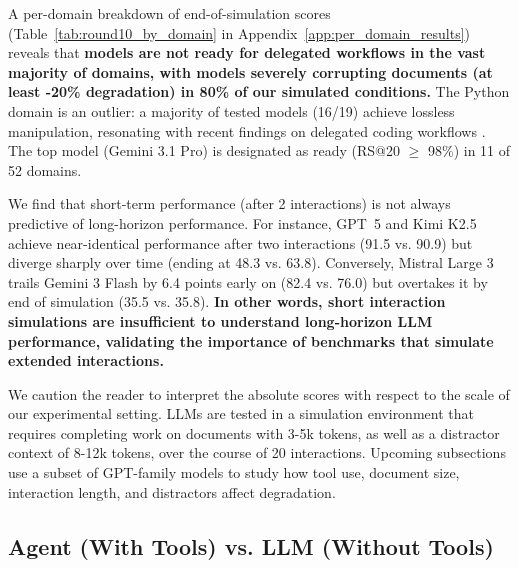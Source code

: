 \documentclass{article} %
\begin{document}
A per-domain breakdown of end-of-simulation scores (Table~\ref{tab:round10_by_domain} in Appendix~\ref{app:per_domain_results}) reveals that \textbf{models are not ready for delegated workflows in the vast majority of domains, with models severely corrupting documents (at least -20\% degradation) in 80\% of our simulated conditions.} The Python domain is an outlier: a majority of tested models (16/19) achieve lossless manipulation, resonating with recent findings on delegated coding workflows \citep{Pimenova2025GoodVA}. The top model (Gemini 3.1 Pro) is designated as ready (RS@20 $\geq$ 98\%) in 11 of 52 domains.

We find that short-term performance (after 2 interactions) is not always predictive of long-horizon performance. For instance, GPT~5 and Kimi K2.5 achieve near-identical performance after two interactions (91.5 vs. 90.9) but diverge sharply over time (ending at 48.3 vs. 63.8). Conversely, Mistral Large 3 trails Gemini 3 Flash by 6.4 points early on (82.4 vs. 76.0) but overtakes it by end of simulation (35.5 vs. 35.8). \textbf{In other words, short interaction simulations are insufficient to understand long-horizon LLM performance, validating the importance of benchmarks that simulate extended interactions.}

We caution the reader to interpret the absolute scores with respect to the scale of our experimental setting. LLMs are tested in a simulation environment that requires completing work on documents with 3-5k tokens, as well as a distractor context of 8-12k tokens, over the course of 20 interactions. Upcoming subsections use a subset of GPT-family models to study how tool use, document size, interaction length, and distractors affect degradation.

\subsection{Agent (With Tools) vs. LLM (Without Tools)} \label{sec:agentic}
\end{document}
